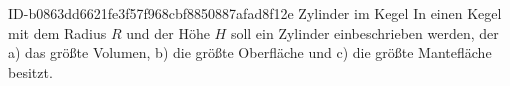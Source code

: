 \begin{exercise}
      {ID-b0863dd6621fe3f57f968cbf8850887afad8f12e}
      {Zylinder im Kegel}
  \ifproblem\problem
    In einen Kegel mit dem Radius $R$ und der Höhe $H$ soll ein Zylinder
    einbeschrieben werden, der
    \quad a) das größte Volumen,
    \quad b) die größte Oberfläche und
    \quad c) die größte Mantefläche
    besitzt.
  \fi
\end{exercise}
